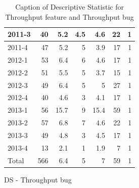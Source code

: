 \documentclass[UKenglish]{ifimaster}  %
\begin{document}
\begin{appendices}
\begin{table}[!htbp]
\begin{adjustwidth}{-1.5cm}{}
\begin{subfigure}[b]{0.3\textwidth}
{\begin{tabular}{ | l | r | r | r | r | r | r | }
 2011-3  & 40 & 5.2 & 4.5 & 4.6 & 22 & 1 \\ \hline
 2011-4  & 47 & 5.2 & 5 & 3.9 & 17 & 1 \\ \hline
 2012-1  & 53 & 6.4 & 6 & 4.6 & 17 & 1 \\ \hline
 2012-2  & 51 & 5.5 & 5 & 3.7 & 15 & 1 \\ \hline
 2012-3  & 49 & 6.4 & 5 & 5 & 27 & 1 \\ \hline
 2012-4  & 40 & 4.6 & 3 & 4.1 & 17 & 1 \\ \hline
 2013-1  & 56 & 15.7 & 9 & 15.4 & 59 & 1 \\ \hline
 2013-2  & 57 & 6.8 & 7 & 4.6 & 22 & 1 \\ \hline
 2013-3  & 49 & 4.8 & 3 & 4.5 & 17 & 1 \\ \hline
 2013-4  & 13 & 2.1 & 1 & 1.9 & 7 & 1 \\ \hline
 Total  & 566 & 6.4 & 5 & 7 & 59 & 1 \\ \hline
\end{tabular}
}
\caption{DS - Throughput bug}
 \label{DS:TPB:5}
\end{subfigure}
\end{adjustwidth}
\caption[Optional caption for list of figures]{Caption of Descriptive Statistic for Throughput feature and Throughput bug}
\label{DS:5:2}
\end{table}



\end{appendices}
\end{document}
